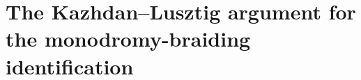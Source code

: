 %
%
%
%

\label{sec:synthetic-chiral}%
\label{sec:transchromatic-genus-tower}%
\label{sec:chromatic-modular-functor}%
\label{sec:telescope-blueshift}%


\section{The Kazhdan--Lusztig argument for the monodromy-braiding identification}
\label{sec:KL-monodromy-braiding}

\providecommand{\fS}{\mathfrak{S}}
\providecommand{\cL}{\mathcal{L}}
\providecommand{\cM}{\mathcal{M}}
\providecommand{\Nil}{\widetilde{\mathcal{N}}}
\providecommand{\fg}{\mathfrak{g}}

